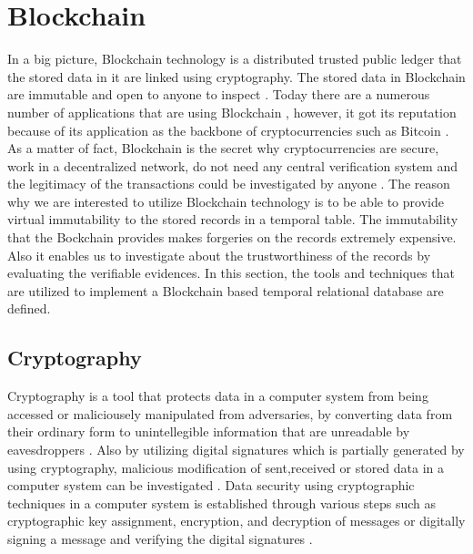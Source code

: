 

	\section{Blockchain} \label{sec:blockchain}
		In a big picture, Blockchain technology is a distributed trusted public ledger that the stored data in it are linked using cryptography. The stored data in Blockchain are immutable and open to anyone to inspect \cite{OECD2016Science}. Today there are a numerous number of applications that are using Blockchain \cite{dhillon2017blockchain}, however, ‌it got its reputation because of its application as the backbone of cryptocurrencies such as Bitcoin \cite{nakamoto2008bitcoin}. As a matter of fact, Blockchain is the secret why cryptocurrencies are secure, work in a decentralized network, do not need any central verification system and the legitimacy of the transactions could be investigated by anyone \cite{halaburda2016beyond}.
		The reason why we are interested to utilize Blockchain technology is to be able to provide virtual immutability to the stored records in a temporal table. The immutability that the Bockchain provides makes forgeries on the records extremely expensive. Also it enables us to investigate about the trustworthiness of the records by evaluating the verifiable evidences. In this section, the tools and techniques that are utilized to implement a Blockchain based temporal relational database are defined.

		\subsection{Cryptography} \label{sec:cryptography}
			Cryptography is a tool that protects data in a computer system from being accessed or maliciousely manipulated from adversaries, by converting data from their ordinary form to unintellegible information that are unreadable by eavesdroppers \cite{kapoor2011cryptography}. Also by utilizing digital signatures which is partially generated by using cryptography, malicious modification of sent,received or stored data in a computer system can be investigated \cite{katz2010digital}. Data security using cryptographic techniques in a computer system is established through various steps such as cryptographic key assignment, encryption, and decryption of messages or digitally signing a message and verifying the digital signatures \cite{stallings2017cryptography}.

